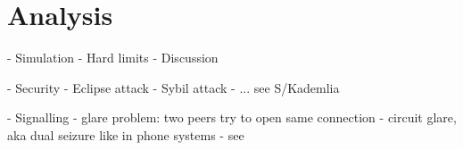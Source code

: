 \chapter{Analysis}
- Simulation
- Hard limits
- Discussion

- Security
    - Eclipse attack
    - Sybil attack
    - ... see S/Kademlia

- Signalling
    - glare problem: two peers try to open same connection
        - circuit glare, aka dual seizure like in phone systems
        - see \cite[p 194-194]{signaling-systems-book}
